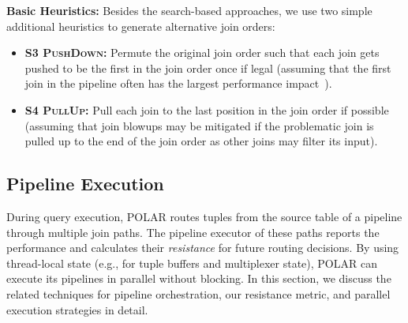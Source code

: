\textbf{Basic Heuristics:} Besides the search-based approaches, we use two simple additional heuristics to generate alternative join orders: 
\begin{itemize}
\item \textbf{S3 \textsc{PushDown}:} Permute the original join order such that each join gets pushed to be the first in the join order once if legal (assuming that the first join in the pipeline often has the largest performance impact~\cite{DBLP:conf/damon/SchubertGZM23}).
\item \textbf{S4 \textsc{PullUp}:} Pull each join to the last position in the join order if possible (assuming that join blowups may be mitigated if the problematic join is pulled up to the end of the join order as other joins may filter its input).
\end{itemize}

\subsection{Pipeline Execution}\label{sec:execution}

During query execution, POLAR routes tuples from the source table of a pipeline through multiple join paths. The pipeline executor of these paths reports the performance and calculates their \emph{resistance} for future routing decisions. By using thread-local state (e.g., for tuple buffers and multiplexer state), POLAR can execute its pipelines in parallel without blocking. In this section, we discuss the related techniques for pipeline orchestration, our resistance metric, and parallel execution strategies in detail.


